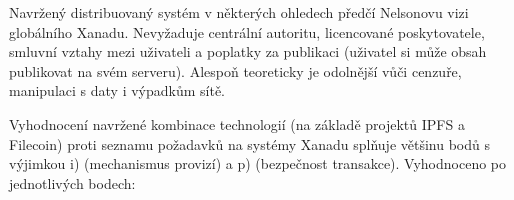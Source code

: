 Navržený distribuovaný systém v některých ohledech předčí Nelsonovu vizi globálního Xanadu. Nevyžaduje centrální autoritu, licencované poskytovatele, smluvní vztahy mezi uživateli a poplatky za publikaci (uživatel si může obsah publikovat na svém serveru). Alespoň teoreticky je odolnější vůči cenzuře, manipulaci s daty i výpadkům sítě.

Vyhodnocení navržené kombinace technologií (na základě projektů IPFS a Filecoin) proti seznamu požadavků na systémy Xanadu  splňuje většinu bodů s výjimkou i) (mechanismus provizí) a p) (bezpečnost transakce).
Vyhodnoceno po jednotlivých bodech:


\newcommand\litem[1]{%
\begin{samepage}%
\item{\bfseries#1\mbox{}\\}%
\end{samepage}\pagebreak[2]\ignorespaces%
}

